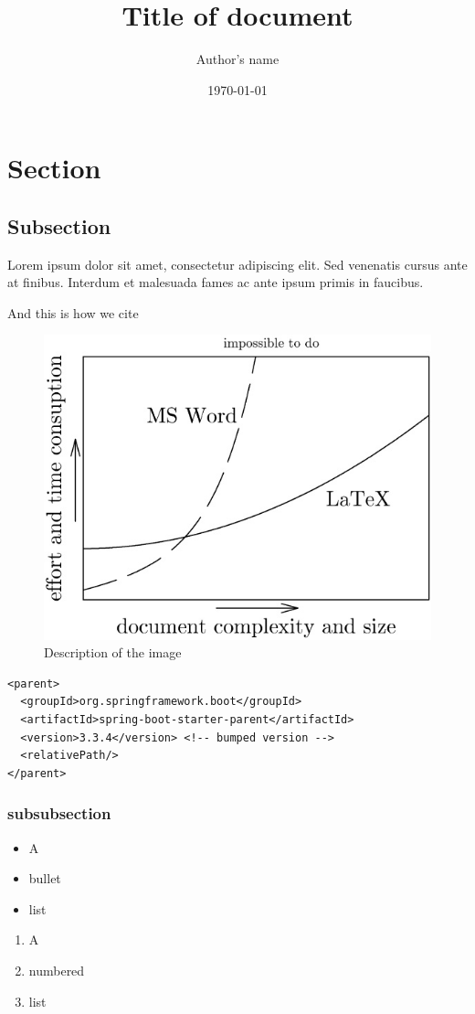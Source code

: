 \documentclass[11pt, oneside, titlepage]{article}   	%
\title{Title of document}
\author{Author's name}
\date{\today}
\begin{document}
\maketitle

\tableofcontents

\clearpage

\section{Section}

\subsection{Subsection}
Lorem ipsum dolor sit amet, consectetur adipiscing elit.
Sed venenatis cursus ante at finibus.
Interdum et malesuada fames ac ante ipsum primis in faucibus.

And this is how we cite \cite{example}

\begin{figure}[H]
	\centering
	\includegraphics{latex-comparison}
	\caption{Description of the image}
\end{figure}


\begin{verbatim}
<parent>
  <groupId>org.springframework.boot</groupId>
  <artifactId>spring-boot-starter-parent</artifactId>
  <version>3.3.4</version> <!-- bumped version -->
  <relativePath/>
</parent>
\end{verbatim}

\subsubsection{subsubsection}

\begin{itemize}
  \item A
  \item bullet
  \item list
\end{itemize}

\begin{enumerate}
  \item A
  \item numbered
  \item list
\end{enumerate}

\clearpage

\end{document}
